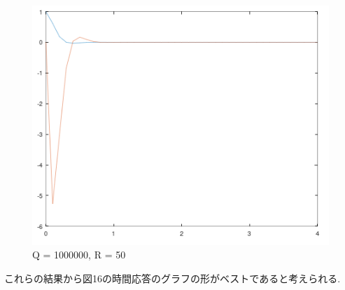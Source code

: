 \documentclass{jsarticle}
\begin{document}
\begin{figure}[h!]
\begin{minipage}{0.325\linewidth}
    \includegraphics[width=\linewidth]{./fig/q1000000_r50.png}
    \caption{Q = 1000000, R = 50}
  \end{minipage}
\end{figure}

これらの結果から図16の時間応答のグラフの形がベストであると考えられる.\\
\vspace*{10mm}
\end{document}
